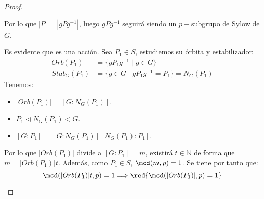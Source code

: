 \begin{teo}
\begin{proof}
\begin{enumerate}
\begin{itemize}
\begin{itemize}
                        \end{itemize}
                        Por lo que $|P| = |gPg^{-1}|$, luego $gPg^{-1}$ seguirá siendo un $p-$subgrupo de Sylow de $G$.
                \end{itemize}
                Es evidente que es una acción. Sea $P_1\in S$, estudiemos su órbita y estabilizador:
                \begin{align*}
                    Orb(P_1) &= \{gP_1g^{-1}\mid g\in G\} \\
                    Stab_G(P_1) &= \{g\in G \mid gP_1g^{-1} = P_1\} = N_G(P_1)
                \end{align*}
                Tenemos:
                \begin{itemize}
                    \item $|Orb(P_1)| = [G:N_G(P_1)]$.
                    \item $P_1 \lhd N_G(P_1) < G$.
                    \item $[G:P_1] = [G:N_G(P_1)][N_G(P_1):P_1]$.
                \end{itemize}
                Por lo que $|Orb(P_1)|$ divide a $[G:P_1] = m$, existirá $t\in \mathbb{N}$ de forma que $m = |Orb(P_1)|t$. Además, como $P_1\in S$, $\mcd(m,p) = 1$. Se tiene por tanto que:
                \begin{equation*}
                    \mcd(|Orb(P_1)|t, p) = 1 \Longrightarrow \red{\mcd(|Orb(P_1)|,p) = 1}
                \end{equation*}


\end{enumerate}
\end{proof}
\end{teo}
